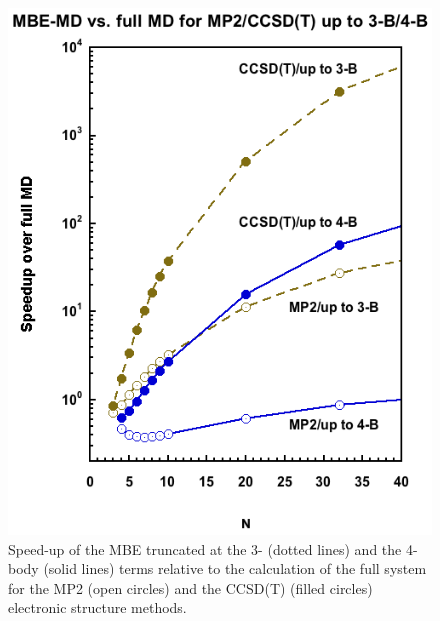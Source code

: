 \begin{figure}[t]
\uwsinglespace
\begin{center}
\begin{minipage}{0.5\textwidth}
\includegraphics[width=\textwidth]{Figures/Chapter_4/ch4_figure_2.png}
\end{minipage}
\end{center}
\begin{spacing}{1.0}
\caption[Speed-up of the MBE truncated at the 3- (dotted lines) and the 4-body (solid lines) terms relative to the calculation of the full system for the MP2 (open circles) and the CCSD(T) (filled circles) electronic structure methods.]{Speed-up of the MBE truncated at the 3- (dotted lines) and the 4-body (solid lines) terms relative to the calculation of the full system for the MP2 (open circles) and the CCSD(T) (filled circles) electronic structure methods.}\label{fig:MBE_MD_F2}
\end{spacing}
\end{figure}